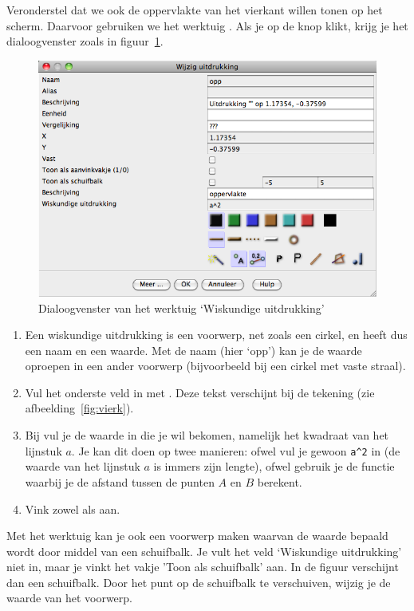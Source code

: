 Veronderstel dat we ook de oppervlakte van het vierkant willen tonen op het scherm. Daarvoor gebruiken we het  werktuig . Als je op de knop klikt, krijg je het dialoogvenster zoals in figuur~\ref{fig:wisk_uitdr}.
\begin{figure}
\centering
\includegraphics[width=\textwidth]{figuren/PeL/wisk_uitdrukking.png}
\caption{Dialoogvenster van het werktuig `Wiskundige uitdrukking'}
\label{fig:wisk_uitdr}
\end{figure}
\begin{enumerate}
\item Een wiskundige uitdrukking is een voorwerp, net zoals een cirkel, en heeft dus een naam en een waarde. Met de naam (hier `opp') kan je de waarde oproepen in een ander voorwerp (bijvoorbeeld bij een cirkel met vaste straal). 
\item Vul het onderste veld  in met .  Deze tekst verschijnt bij de tekening (zie afbeelding~\ref{fig:vierk}). 
\item Bij  vul je de waarde in die je wil bekomen, namelijk het kwadraat van het lijnstuk $a$. Je kan dit doen op twee manieren: ofwel vul je gewoon \verb/a^2/ in (de waarde van het lijnstuk $a$ is immers zijn lengte), ofwel gebruik je de functie  waarbij je de afstand tussen de punten $A$ en $B$ berekent. \item Vink zowel  als  aan.
\end{enumerate}
Met het werktuig  kan je ook een voorwerp maken waarvan de waarde bepaald wordt door middel van een schuifbalk. Je vult het veld `Wiskundige uitdrukking' niet in, maar je vinkt het vakje 'Toon als schuifbalk' aan. In de figuur verschijnt dan een schuifbalk. Door het punt op de schuifbalk te verschuiven, wijzig je de waarde van het voorwerp.

